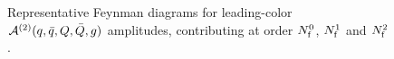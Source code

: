 \begin{figure}[ht]
  \begin{center}
\end{center} 
\caption{Representative Feynman diagrams for leading-color
$\mathcal{A}^{(2)}(q,\bar q,Q,\bar Q,g)$ amplitudes, 
contributing at order
$N_\mathrm{f}^0$, $N_\mathrm{f}^1$ and $N_\mathrm{f}^2$.}
\label{fig_parents4q1g}
\end{figure}


